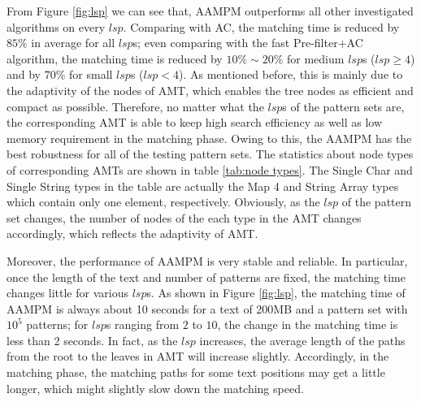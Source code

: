 \documentclass{article}
\begin{document}
From Figure \ref{fig:lsp} we can see that, \textsf{AAMPM} outperforms
all other investigated algorithms on every $lsp$. Comparing with
\textsf{AC}, the matching time is reduced by $85\%$ in average for all
$lsp$s; even comparing with the fast \textsf{Pre-filter+AC} algorithm,
the matching time is reduced by $10\% \sim 20\%$ for medium $lsp$s
($lsp \geq 4$) and by $70\%$ for small $lsp$s ($lsp < 4$). As
mentioned before, this is mainly due to the adaptivity of the nodes of
AMT, which enables the tree nodes as efficient and compact as
possible. Therefore, no matter what the $lsp$s of the pattern sets
are, the corresponding AMT is able to keep high search efficiency as
well as low memory requirement in the matching phase. Owing to this,
the \textsf{AAMPM} has the best robustness for all of the testing
pattern sets. The statistics about node types of corresponding AMTs
are shown in table \ref{tab:node types}. The Single Char and Single
String types in the table are actually the Map 4 and String Array
types which contain only one element, respectively. Obviously, as the
$lsp$ of the pattern set changes, the number of nodes of the each type
in the AMT changes accordingly, which reflects the adaptivity of AMT.

Moreover, the performance of \textsf{AAMPM} is very stable and
reliable. In particular, once the length of the text and number of
patterns are fixed, the matching time changes little for various
$lsp$s. As shown in Figure \ref{fig:lsp}, the matching time of
\textsf{AAMPM} is always about 10 seconds for a text of 200MB and a
pattern set with $10^5$ patterns; for $lsp$s ranging from $2$ to $10$,
the change in the matching time is less than 2 seconds. In fact, as
the $lsp$ increases, the average length of the paths from the root to
the leaves in AMT will increase slightly. Accordingly, in the matching
phase, the matching paths for some text positions may get a little
longer, which might slightly slow down the matching speed.

\end{document}
